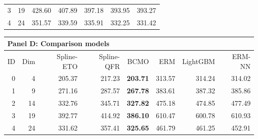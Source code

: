 \begin{table}[htbp]
\begin{tabular}{rrrrrrr}
3 & 19 & 428.60 & 407.89 & 397.18 & 393.95 & 393.27 \\
4 & 24 & 351.57 & 339.59 & 335.91 & 332.25 & 331.42 \\
\bottomrule
\end{tabular}
\par\medskip
\begin{tabular}{rrrrrrrr}
\toprule
\multicolumn{8}{l}{\textbf{Panel D: Comparison models}} \\
\midrule
ID & Dim & Spline-ETO & Spline-QFR & BCMO & ERM & LightGBM & ERM-NN \\
\midrule
0 & 4 & 205.37 & 217.23 & \textbf{203.71} & 313.57 & 314.24 & 314.02 \\
1 & 9 & 271.16 & 287.57 & \textbf{267.78} & 383.61 & 387.32 & 385.86 \\
2 & 14 & 332.76 & 345.71 & \textbf{327.82} & 475.18 & 474.85 & 477.49 \\
3 & 19 & 392.77 & 414.92 & \textbf{386.10} & 610.47 & 600.78 & 610.93 \\
4 & 24 & 331.62 & 357.41 & \textbf{325.65} & 461.79 & 461.25 & 452.91 \\
\bottomrule
\end{tabular}
\end{table}
